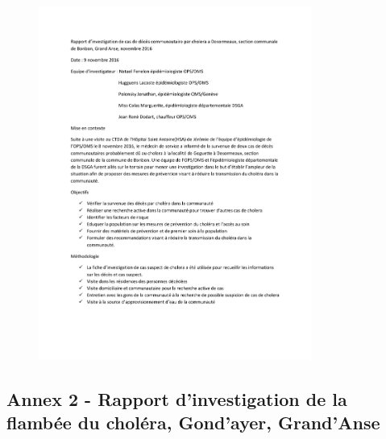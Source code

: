 \documentclass[]{tufte-handout}
\begin{document}
\clearpage

\begin{figure}
\includegraphics[page=3, width=0.8\textwidth]{annex/inv_desormeaux.pdf}
\end{figure}

\clearpage

\subsection{Annex 2 - Rapport d'investigation de la flambée du choléra,
Gond'ayer,
Grand'Anse}\label{annex-2---rapport-dinvestigation-de-la-flambee-du-cholera-gondayer-grandanse}
\end{document}
